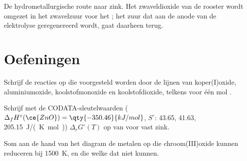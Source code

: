 \begin{omfigure}

{\small De hydrometallurgische route naar zink. Het zwaveldioxide van de rooster
wordt omgezet in het zwavelzuur voor het ; het zuur dat aan de
anode van de elektrolyse geregenereerd wordt, gaat daarheen terug.}
\end{omfigure}

\section{Oefeningen}

\begin{exercise}[$\star$]\label{exo:b2:ellingham:1}
Schrijf de reacties op die voorgesteld worden door de lijnen van koper(I)oxide, aluminiumoxide, koolstofmonoxide
en koolstofdioxide, telkens voor één mol .
\end{exercise}

\begin{exercise}[$\star$]\label{exo:b2:ellingham:2}
Schrijf met de CODATA-sleutelwaarden ($\Delta_f H^\circ(\ce{ZnO}) = \qty{-350.46}{kJ/mol}$,
$S^\circ$:  43.65,  41.63,  \qty{205.15}{J/(K.mol)})
$\Delta_r G^\circ(T)$ op van  voor vast zink.
\end{exercise}

\begin{exercise}[$\star$]\label{exo:b2:ellingham:3}
Som aan de hand van het diagram de metalen op die chroom(III)oxide kunnen reduceren bij
\qty{1500}{K}, en die welke dat niet kunnen.
\end{exercise}

